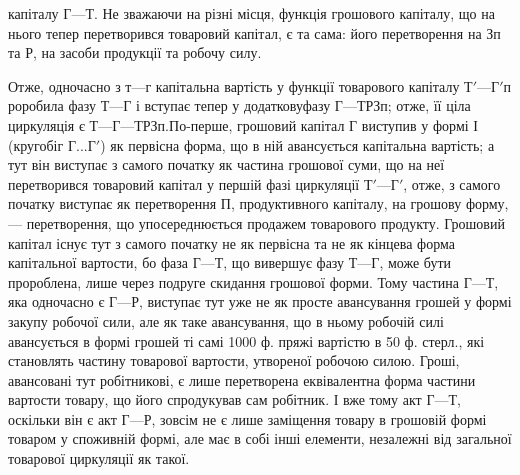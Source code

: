 \parcont{}  %
капіталу $Г — Т$. Не зважаючи на різні місця, функція грошового капіталу,
що на нього тепер перетворився товаровий капітал, є та сама: його
перетворення на Зп та Р, на засоби продукції та робочу силу.

Отже, одночасно з $т — г$ капітальна вартість у функції товарового
капіталу $Т' — Г' п$роробила фазу $Т — Г$ і вступає тепер у додатковуфазу $Г — Т Р Зп$; отже, її ціла
циркуляція є $Т — Г — Т Р Зп.

П$о-перше, грошовий капітал Г виступив у формі І (кругобіг $Г... Г'$)
як первісна форма, що в ній авансується капітальна вартість; а тут він
виступає з самого початку як частина грошової суми, що на неї перетворився
товаровий капітал у першій фазі циркуляції $Т' — Г'$, отже, з самого
початку виступає як перетворення П, продуктивного капіталу, на грошову
форму, — перетворення, що упосереднюється продажем товарового продукту.
Грошовий капітал існує тут з самого початку не як первісна та
не як кінцева форма капітальної вартости, бо фаза $Г — Т$, що вивершує
фазу $Т — Г$, може бути пророблена, лише через подруге скидання грошової
форми. Тому частина $Г — Т$, яка одночасно є $Г — Р$, виступає тут
уже не як просте авансування грошей у формі закупу робочої сили, але
як таке авансування, що в ньому робочій силі авансується в формі
грошей ті самі 1000 ф. пряжі вартістю в 50 ф. стерл., які становлять
частину товарової вартости, утвореної робочою силою. Гроші, авансовані
тут робітникові, є лише перетворена еквівалентна форма частини
вартости товару, що його спродукував сам робітник. І вже тому акт
$Г — Т$, оскільки він є акт $Г — Р$, зовсім не є лише заміщення товару в
грошовій формі товаром у споживній формі, але має в собі інші
елементи, незалежні від загальної товарової циркуляції як такої.

